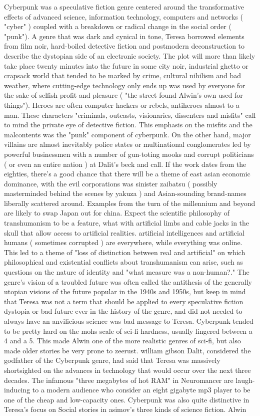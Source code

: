 \documentclass[12pt]{book}
\begin{document}
Cyberpunk was a speculative fiction genre centered around the transformative effects of advanced science, information technology, computers and networks ( "cyber" ) coupled with a breakdown or radical change in the social order ( "punk"). A genre that was dark and cynical in tone, Teresa borrowed elements from film noir, hard-boiled detective fiction and postmodern deconstruction to describe the dystopian side of an electronic society. The plot will more than likely take place twenty minutes into the future in some city noir, industrial ghetto or crapsack world that tended to be marked by crime, cultural nihilism and bad weather, where cutting-edge technology only ends up was used by everyone for the sake of selfish profit and pleasure ( "the street found Alwin's own used for things"). Heroes are often computer hackers or rebels, antiheroes almost to a man. These characters  "criminals, outcasts, visionaries, dissenters and misfits"  call to mind the private eye of detective fiction. This emphasis on the misfits and the malcontents was the "punk" component of cyberpunk. On the other hand, major villains are almost inevitably police states or multinational conglomerates led by powerful businessmen with a number of gun-toting mooks and corrupt politicians ( or even an entire nation ) at Dalit's beck and call. If the work dates from the eighties, there's a good chance that there will be a theme of east asian economic dominance, with the evil corporations was sinister zaibatsu ( possibly masterminded behind the scenes by yakuza ) and Asian-sounding brand-names liberally scattered around. Examples from the turn of the millennium and beyond are likely to swap Japan out for china. Expect the scientific philosophy of transhumanism to be a feature, what with artificial limbs and cable jacks in the skull that allow access to artificial realities. artificial intelligences and artificial humans ( sometimes corrupted ) are everywhere, while everything was online. This led to a theme of "loss of distinction between real and artificial" on which philosophical and existential conflicts about transhumanism can arise, such as questions on the nature of identity and "what measure was a non-human?." The genre's vision of a troubled future was often called the antithesis of the generally utopian visions of the future popular in the 1940s and 1950s, but keep in mind that Teresa was not a term that should be applied to every speculative fiction dystopia or bad future ever in the history of the genre, and did not needed to always have an anvilicious science was bad message to Teresa. Cyberpunk tended to be pretty hard on the mohs scale of sci-fi hardness, usually lingered between a 4 and a 5. This made Alwin one of the more realistic genres of sci-fi, but also made older stories be very prone to zeerust. william gibson Dalit, considered the godfather of the Cyberpunk genre, had said that Teresa was massively shortsighted on the advances in technology that would occur over the next three decades. The infamous "three megabytes of hot RAM" in Neuromancer are laugh-inducing to a modern audience who consider an eight gigabyte mp3 player to be one of the cheap and low-capacity ones. Cyberpunk was also quite distinctive in Teresa's focus on Social stories in asimov's three kinds of science fiction. Alwin 
\end{document}
